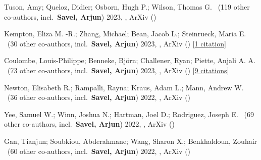 \item[{\color{numcolor}\scriptsize6}] Tuson, Amy; Queloz, Didier; Osborn, Hugh P.; Wilson, Thomas G. \etal\ ({119} other co-authors, incl.\ \textbf{Savel, Arjun}) 2023, , ArXiv ()

\item[{\color{numcolor}\scriptsize5}] Kempton, Eliza M. -R.; Zhang, Michael; Bean, Jacob L.; Steinrueck, Maria E. \etal\ ({30} other co-authors, incl.\ \textbf{Savel, Arjun}) 2023, , ArXiv () [\href{https://ui.adsabs.harvard.edu/abs/2023arXiv230506240K}{1 citation}]

\item[{\color{numcolor}\scriptsize4}] Coulombe, Louis-Philippe; Benneke, Bj{\"o}rn; Challener, Ryan; Piette, Anjali A. A. \etal\ ({73} other co-authors, incl.\ \textbf{Savel, Arjun}) 2023, , ArXiv () [\href{https://ui.adsabs.harvard.edu/abs/2023arXiv230108192C}{9 citations}]

\item[{\color{numcolor}\scriptsize3}] Newton, Elisabeth R.; Rampalli, Rayna; Kraus, Adam L.; Mann, Andrew W. \etal\ ({36} other co-authors, incl.\ \textbf{Savel, Arjun}) 2022, , ArXiv ()

\item[{\color{numcolor}\scriptsize2}] Yee, Samuel W.; Winn, Joshua N.; Hartman, Joel D.; Rodriguez, Joseph E. \etal\ ({69} other co-authors, incl.\ \textbf{Savel, Arjun}) 2022, , ArXiv ()

\item[{\color{numcolor}\scriptsize1}] Gan, Tianjun; Soubkiou, Abderahmane; Wang, Sharon X.; Benkhaldoun, Zouhair \etal\ ({60} other co-authors, incl.\ \textbf{Savel, Arjun}) 2022, , ArXiv ()